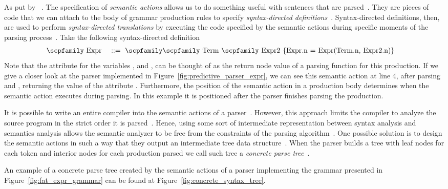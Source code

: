 \documentclass[
  oneside,
  english,
  coorientadorbanca,
  noabntexcite
]{ufsc-thesis-rn46-2019}
\def\bnfdef{::=}
\newcommand{\codett}[1]{\text{\scpfamily#1}}
\newcommand{\code}[1]{\text{\scpfamily\setlength\spaceskip{0.35em}#1}}
\newcommand{\bnfvar}[1]{\codett{#1}}
\newcommand{\bnfprod}[2]{\bnfvar{#1} & \ & \bnfdef{} & \ \code{#2}}
\begin{document}
As put by~\textcite{appel2003modern} .
The specification of \textit{semantic actions} allows us to do something useful with sentences that are parsed~\cite{appel2003modern}.
They are pieces of code that we can attach to the body of grammar production rules to specify \textit{syntax-directed definitions}~\cite{Aho:2006:CPT:1177220}.
Syntax-directed definitions, then, are used to perform \textit{syntax-directed translations} by executing the code specified by the semantic actions during specific moments of the parsing process~\cite{Aho:2006:CPT:1177220}.
Take the following syntax-directed definition
\begin{alignat}{2}
  \bnfprod{Expr}{\bnfvar{Term} \bnfvar{Expr2} \{Expr.n = Expr(Term.n, Expr2.n)\}} \label{eq:sdd_example}
\end{alignat}
Note that the attribute \codett{n} for the variables \bnfvar{Expr}, \bnfvar{Term} and \bnfvar{Expr2}, can be thought of as the return node value of a parsing function for this production.
If we give a closer look at the parser implemented in Figure~\ref{fig:predictive_parser_expr}, we can see this semantic action at line 4, after parsing \bnfvar{Term} and \bnfvar{Expr2}, returning the value of the attribute \codett{Expr.n}.
Furthermore, the position of the semantic action in a production body determines when the semantic action executes during parsing.
In this example it is positioned after the parser finishes parsing the production.

It is possible to write an entire compiler into the semantic actions of a parser~\cite{appel2003modern}.
However, this approach limits the compiler to analyze the source program in the strict order it is parsed~\cite{appel2003modern}.
Hence, using some sort of intermediate representation between syntax analysis and semantics analysis allows the semantic analyzer to be free from the constraints of the parsing algorithm~\cite{appel2003modern}.
One possible solution is to design the semantic actions in such a way that they output an intermediate tree data structure~\cite{appel2003modern}.
When the parser builds a tree with leaf nodes for each token and interior nodes for each production parsed we call such tree a \textit{concrete parse tree}~\cite{appel2003modern}.

An example of a concrete parse tree created by the semantic actions of a parser implementing the grammar presented in Figure~\ref{fig:fat_expr_grammar} can be found at Figure~\ref{fig:concrete_syntax_tree}.
\end{document}
